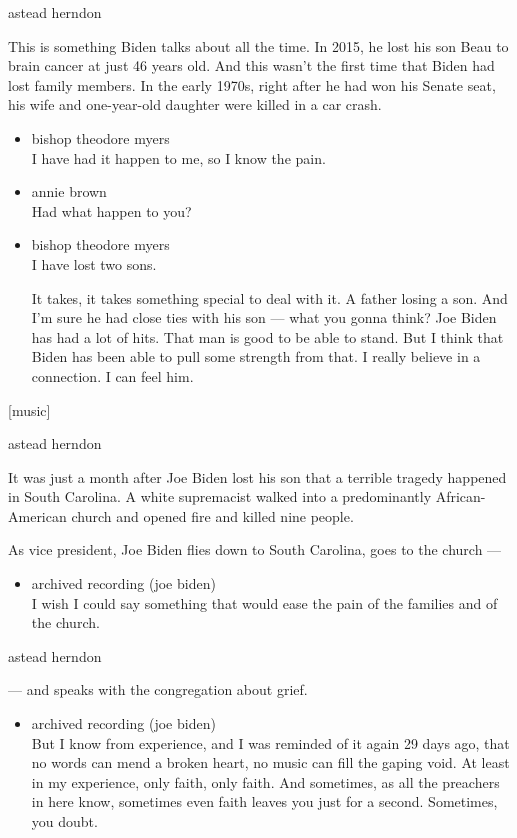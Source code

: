 astead herndon

This is something Biden talks about all the time. In 2015, he lost his
son Beau to brain cancer at just 46 years old. And this wasn't the first
time that Biden had lost family members. In the early 1970s, right after
he had won his Senate seat, his wife and one-year-old daughter were
killed in a car crash.

\begin{itemize}
\item
  bishop theodore myers\\
  I have had it happen to me, so I know the pain.
\item
  annie brown\\
  Had what happen to you?
\item
  bishop theodore myers\\
  I have lost two sons.

  It takes, it takes something special to deal with it. A father losing
  a son. And I'm sure he had close ties with his son --- what you gonna
  think? Joe Biden has had a lot of hits. That man is good to be able to
  stand. But I think that Biden has been able to pull some strength from
  that. I really believe in a connection. I can feel him.
\end{itemize}

{[}music{]}

astead herndon

It was just a month after Joe Biden lost his son that a terrible tragedy
happened in South Carolina. A white supremacist walked into a
predominantly African-American church and opened fire and killed nine
people.

As vice president, Joe Biden flies down to South Carolina, goes to the
church ---

\begin{itemize}
\tightlist
\item
  archived recording (joe biden)\\
  I wish I could say something that would ease the pain of the families
  and of the church.
\end{itemize}

astead herndon

--- and speaks with the congregation about grief.

\begin{itemize}
\tightlist
\item
  archived recording (joe biden)\\
  But I know from experience, and I was reminded of it again 29 days
  ago, that no words can mend a broken heart, no music can fill the
  gaping void. At least in my experience, only faith, only faith. And
  sometimes, as all the preachers in here know, sometimes even faith
  leaves you just for a second. Sometimes, you doubt.
\end{itemize}

